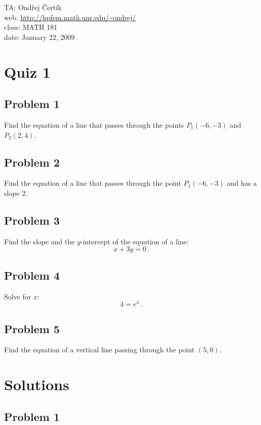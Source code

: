 \documentclass[10pt]{article}
\begin{document}
\noindent TA: Ondřej Čertík\\
web: \url{http://hpfem.math.unr.edu/~ondrej/}\\
class: MATH 181\\
date: January 22, 2009

\section*{Quiz 1}

\subsection*{Problem 1}

Find the equation of a line that passes through the points $P_1(-6, -3)$ and
$P_2(2, 4)$.

\subsection*{Problem 2}

Find the equation of a line that passes through the point $P_1(-6, -3)$ and has
a slope 2.

\subsection*{Problem 3}

Find the slope and the $y$-intercept of the equation of a line:
$$x+3y=0\,.$$

\subsection*{Problem 4}

Solve for $x$:
$$4=e^x\,.$$

\subsection*{Problem 5}

Find the equation of a vertical line passing through the point $(5, 0)$.

\section*{Solutions}

\subsection*{Problem 1}
\end{document}
